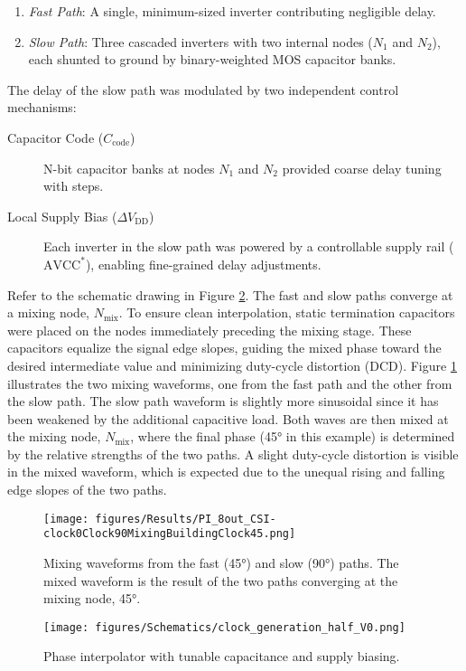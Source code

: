 \begin{enumerate}
  \item \emph{Fast Path}: A single, minimum-sized inverter contributing negligible delay.
  \item \emph{Slow Path}: Three cascaded inverters with two internal nodes ($N_1$ and $N_2$), each shunted to ground by binary-weighted MOS capacitor banks.
\end{enumerate}

The delay of the slow path was modulated by two independent control mechanisms:
\begin{description}
  \item[Capacitor Code ($C_\text{code}$)] N-bit capacitor banks at nodes $N_1$ and $N_2$ provided coarse delay tuning with steps.
  \item[Local Supply Bias ($\Delta V_\text{DD}$)] Each inverter in the slow path was powered by a controllable supply rail ($\text{AVCC}^*$), enabling fine-grained delay adjustments.
\end{description}

Refer to the schematic drawing in Figure \ref{fig:PI_1_schematic}. The fast and slow paths converge at a mixing node, $N_\text{mix}$. To ensure clean interpolation, static termination capacitors were placed on the nodes immediately preceding the mixing stage. These capacitors equalize the signal edge slopes, guiding the mixed phase toward the desired intermediate value and minimizing duty-cycle distortion (DCD).
Figure \ref{fig:PI_1_mixing_waveforms} illustrates the two mixing waveforms, one from the fast path and the other from the slow path. The slow path waveform is slightly more sinusoidal since it has been weakened by the additional capacitive load. Both waves are then mixed at the mixing node, $N_\text{mix}$, where the final phase (\ang{45} in this example) is determined by the relative strengths of the two paths. A slight duty-cycle distortion is visible in the mixed waveform, which is expected due to the unequal rising and falling edge slopes of the two paths. 
\begin{figure}[h]
  \centering
  \texttt{[image: figures/Results/PI\_8out\_CSI-clock0Clock90MixingBuildingClock45.png]}
  \caption{Mixing waveforms from the fast (\ang{45}) and slow (\ang{90}) paths. The mixed waveform is the result of the two paths converging at the mixing node, \ang{45}.}
  \label{fig:PI_1_mixing_waveforms}
\end{figure}
\begin{figure}[h]
  \centering
  \texttt{[image: figures/Schematics/clock\_generation\_half\_V0.png]}
  \caption{Phase interpolator with tunable capacitance and supply biasing.}
  \label{fig:PI_1_schematic}
\end{figure}

